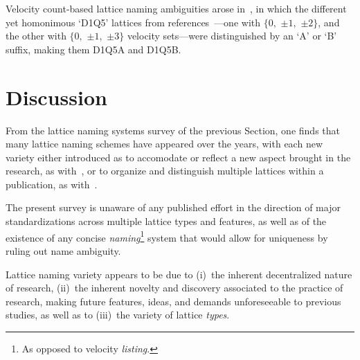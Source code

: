     Velocity count-based lattice naming ambiguities arose in~\cite{2017-PengY+ZhangJM-MathProblEng}, in which the different  yet
    homonimous            `D1Q5'            lattices            from            references~\cite{1998-QianYH+ZhouY-EuroPhysLett,
    2006-ChikatamarlaSS+KarlinIV-PhysRevLett}---one with $\{0,$ $\pm 1,$ $\pm 2\}$, and the other with $\{0,$ $\pm 1,$ $\pm 3\}$
    velocity sets---were distinguished by an `A' or `B' suffix, making them D1Q5A and D1Q5B.



\section{Discussion}

    From the lattice naming systems survey of the previous Section, one finds that many lattice  naming  schemes  have  appeared
    over the years, with each new variety either introduced as to accomodate or reflect a new aspect brought in the research, as
    with~\cite{2006-ShanX+ChenH-JFluidMech,     2008-ChikatamarlaSS+KarlinIV-CompPhysComm,     2006-PhilippiPC+SurmasR-PhysRevE,
    2012-AmbrusVE+SofoneaV-PhysRevE, 2016-NamburiM+AnsumaliS-SciRep}, or to organize and distinguish multiple lattices within  a
    publication,        as        with~\cite{1991-QianYH+LallemandP-AdvKinTheoContMech,        2006-PhilippiPC+SurmasR-PhysRevE,
    2007-OrtizCEP-DrUFSC, 2014-MengJ+ZhangY-JComputPhys, 2017-LiL+KlausnerJF-IntJHeatMassTran}.

    The present survey is unaware of any published effort in the direction of major  standardizations  across  multiple  lattice
    types  and  features,  as  well  as  of  the  existence  of  any  concise  \emph{naming}\footnote{As  opposed  to   velocity
    \emph{listing}.} system that would allow for uniqueness by ruling out name ambiguity.

    Lattice naming variety appears to be due to (i)~the inherent decentralized nature of research, (ii)~the inherent novelty and
    discovery associated to the practice of research, making future features,  ideas,  and  demands  unforeseeable  to  previous
    studies, as well as to (iii)~the variety of lattice \emph{types}.


